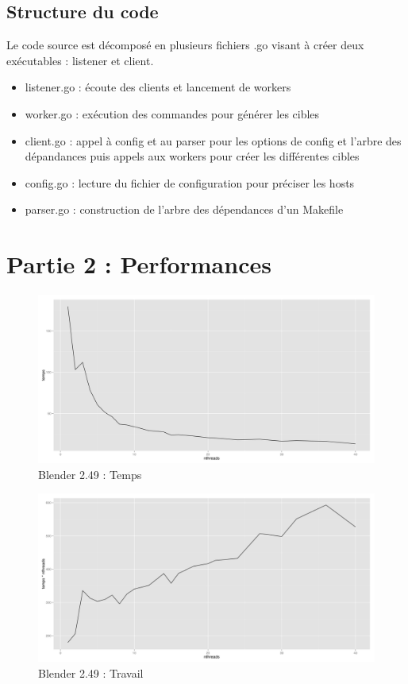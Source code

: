 \documentclass[a4paper,11pt]{article}
\begin{document}
\subsection{Structure du code}
Le code source est décomposé en plusieurs fichiers .go visant à créer deux exécutables : listener et client.
\begin{itemize}
\item listener.go : écoute des clients et lancement de workers
\item worker.go : exécution des commandes pour générer les cibles
\item client.go : appel à config et au parser pour les options de config et l'arbre des dépandances puis appels aux workers pour créer les différentes cibles
\item config.go : lecture du fichier de configuration pour préciser les hosts
\item parser.go : construction de l'arbre des dépendances d'un Makefile
\end{itemize}

\section{Partie 2 : Performances}

\begin{figure}[htbp]
  \centering
  \includegraphics[scale=0.35]{img/blender1_temps.png}
  \caption{Blender 2.49 : Temps}
\end{figure}

\begin{figure}[htbp]
  \centering
  \includegraphics[scale=0.35]{img/blender1_travail.png}
  \caption{Blender 2.49 : Travail}
\end{figure}
\end{document}
